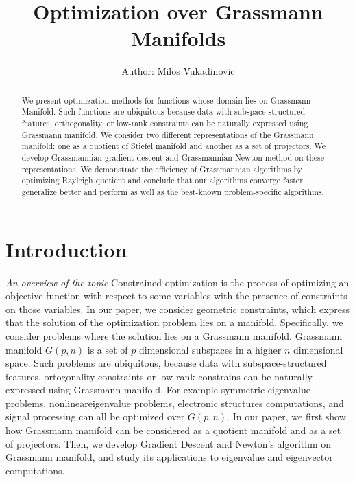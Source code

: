 \documentclass[11pt,a4paper]{report}
\title{Optimization over Grassmann Manifolds}
\author{Author: Milos Vukadinovic}
\date{\parbox{\linewidth}{\centering%
  \endgraf\bigskip
  Advisor: Peter Dalakov \endgraf\medskip
  \bigskip
  Department\ of Mathematics,  \endgraf
  American University in Bulgaria \endgraf
  \bigskip
  \today}}
\begin{document}
\maketitle

\begin{abstract}
We present optimization methods for functions whose domain lies on Grassmann Manifold.
Such functions are ubiquitous because data with subspace-structured features, orthogonality, or low-rank constraints can be naturally expressed using Grassmann manifold.
We consider two different representations of the Grassmann manifold: one as a quotient of Stiefel manifold and another as a set of projectors.
We develop Grassmannian gradient descent and Grassmannian Newton method on these representations.
We demonstrate the efficiency of Grassmannian algorithms by optimizing Rayleigh quotient and conclude that our algorithms converge faster, generalize better and perform as well as the best-known problem-specific algorithms. 
\end{abstract}

\setcounter{tocdepth}{1}
\tableofcontents






\chapter{Introduction}
\textit{An overview of the topic} \newline
Constrained optimization is the process of optimizing an objective function with respect to some variables with the presence of constraints on those variables.
In our paper, we consider geometric constraints, which express that the solution of the optimization problem lies on a manifold.
Specifically, we consider problems where the solution lies on a Grassmann manifold.
Grassmann manifold $G(p,n)$ is a set of $p$ dimensional subspaces in a higher $n$ dimensional space.
Such problems are ubiquitous, because data with subspace-structured features, ortogonality constraints or low-rank constrains can be naturally expressed using Grassmann manifold.
For example symmetric eigenvalue problems, nonlineareigenvalue problems, electronic structures computations, and signal processing can all be optimized over $G(p,n)$.
In our paper, we first show how Grassmann manifold can be considered as a quotient manifold and as a set of projectors. Then, we develop Gradient Descent and Newton's algorithm on Grassmann manifold, and study its applications to eigenvalue and eigenvector computations.
\end{document}
